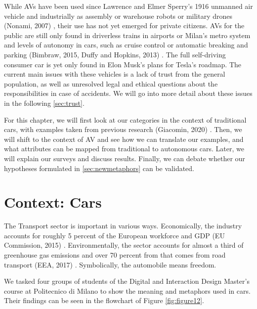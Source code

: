 \documentclass[12pt, usenames, dvipsnames]{report}
\begin{document}
\begin{flushleft}
While AVs have been used since Lawrence and Elmer Sperry's 1916 unmanned air vehicle and industrially as assembly or warehouse robots or military drones (Nonami, 2007) \cite{nonami2007}, their use has not yet emerged for private citizens.
AVs for the public are still only found in driverless trains in airports or Milan's metro system and levels of autonomy in cars, such as cruise control or automatic breaking and parking (Bimbraw, 2015, Duffy and Hopkins, 2013) \cite{bimbraw2015} \cite{duffy2013}. %
The full self-driving consumer car is yet only found in Elon Musk's plans for Tesla's roadmap.
The current main issues with these vehicles is a lack of trust from the general population, as well as unresolved legal and ethical questions about the responsibilities in case of accidents. 
We will go into more detail about these issues in the following \autoref{sec:trust}.

For this chapter, we will first look at our categories in the context of traditional cars, with examples taken from previous research (Giacomin, 2020) \cite{giacomin2020}.
Then, we will shift to the context of AV and see how we can translate our examples, and what attributes can be mapped from traditional to autonomous cars.
Later, we will explain our surveys and discuss results.
Finally, we can debate whether our hypotheses formulated in \autoref{sec:newmetaphors} can be validated.


\section{Context: Cars}

The Transport sector is important in various ways.
Economically, the industry accounts for roughly 5 percent of the European workforce and GDP (EU Commission, 2015) \cite{eucom2015}.
Environmentally, the sector accounts for almost a third of greenhouse gas emissions and over 70 percent from that comes from road transport (EEA, 2017) \cite{eea2019}. 
Symbolically, the automobile means freedom.

We tasked four groups of students of the Digital and Interaction Design Master's course at Politecnico di Milano to show the meaning and metaphors used in cars.
Their findings can be seen in the flowchart of Figure \ref{fig:figure12}.


\end{flushleft}
\end{document}
